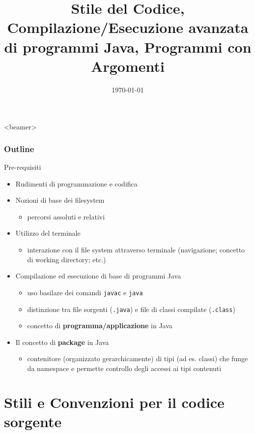 \documentclass[xcolor=dvipsnames,presentation]{beamer}
\title[{\lab} -- Strumenti Avanzati]{Stile del Codice, Compilazione/Esecuzione avanzata di programmi Java, Programmi con Argomenti}
\date[\today]{\today}
\begin{document}
\frame[label=coverpage]{\titlepage}

\begin{frame}<beamer>
    \frametitle{Outline}
    \tableofcontents[]
\end{frame}

\begin{frame}{Pre-requisiti}
\begin{itemize}
\item Rudimenti di programmazione e codifica
\item Nozioni di base dei filesystem
    \begin{itemize}
    \item percorsi assoluti e relativi
    \end{itemize}
\item Utilizzo del terminale
    \begin{itemize}
    \item interazione con il file system attraverso terminale (navigazione; concetto di working directory; etc.)
    \end{itemize}
\item Compilazione ed esecuzione di base di programmi Java
    \begin{itemize}
    \item uso basilare dei comandi \texttt{javac} e \texttt{java}
    \item distinzione tra file sorgenti (\texttt{.java}) e file di classi compilate (\texttt{.class})
    \item concetto di \textbf{programma/applicazione} in Java
    \end{itemize}
\item Il concetto di \textbf{package} in Java
    \begin{itemize}
    \item contenitore (organizzato gerarchicamente) di tipi (ad es. classi) che funge da namespace e permette controllo degli accessi ai tipi contenuti
    \end{itemize}
\end{itemize}
\end{frame}

\section{Stili e Convenzioni per il codice sorgente}
\end{document}

